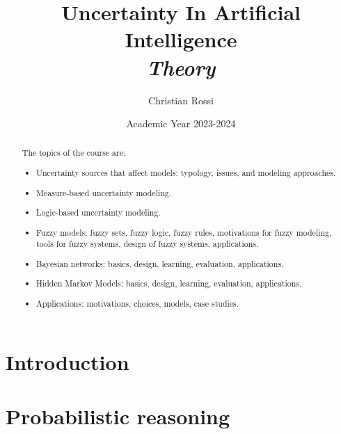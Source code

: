 \documentclass[12pt, a4paper]{report}
\title{Uncertainty In Artificial Intelligence \\ \textit{Theory}}
\author{Christian Rossi}
\date{Academic Year 2023-2024}
\newtheorem[style=M,bodystyle=\normalfont]{theorem}{Theorem}
\newtheorem[style=M,bodystyle=\normalfont]{corollary}{Corollary}
\newtheorem[style=M,bodystyle=\normalfont]{lemma}{Lemma}
\newtheorem[style=M,bodystyle=\normalfont]{definition}{Definition}
\begin{document}
\maketitle

\newpage

\begin{abstract}
    The topics of the course are:
    \begin{itemize}
        \item Uncertainty sources that affect models: typology, issues, and modeling approaches.
        \item Measure-based uncertainty modeling.
        \item Logic-based uncertainty modeling.
        \item Fuzzy models: fuzzy sets, fuzzy logic, fuzzy rules, motivations for fuzzy modeling, tools for fuzzy systems, design 
            of fuzzy systems, applications.
        \item Bayesian networks: basics, design, learning, evaluation, applications.
        \item Hidden Markov Models: basics, design, learning, evaluation, applications.
        \item Applications: motivations, choices, models, case studies.
    \end{itemize}
\end{abstract}

\newpage

\tableofcontents

\newpage

\chapter{Introduction}
    
    






    \newpage

    \chapter{Probabilistic reasoning}
\end{document}
